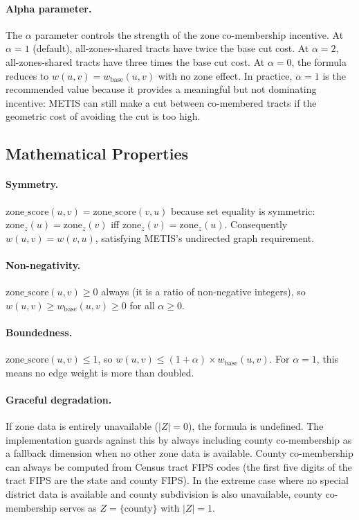 \paragraph{Alpha parameter.}
The $\alpha$ parameter controls the strength of the zone co-membership incentive.
At $\alpha = 1$ (default), all-zones-shared tracts have twice the base cut cost.
At $\alpha = 2$, all-zones-shared tracts have three times the base cut cost.
At $\alpha = 0$, the formula reduces to $w(u,v) = w_{\mathrm{base}}(u,v)$ with no
zone effect.
In practice, $\alpha = 1$ is the recommended value because it provides a meaningful
but not dominating incentive: METIS can still make a cut between co-membered tracts
if the geometric cost of avoiding the cut is too high.

\subsection{Mathematical Properties}

\paragraph{Symmetry.}
$\mathrm{zone\_score}(u,v) = \mathrm{zone\_score}(v,u)$ because set equality is
symmetric: $\mathrm{zone}_z(u) = \mathrm{zone}_z(v)$ iff $\mathrm{zone}_z(v) = \mathrm{zone}_z(u)$.
Consequently $w(u,v) = w(v,u)$, satisfying METIS's undirected graph requirement.

\paragraph{Non-negativity.}
$\mathrm{zone\_score}(u,v) \geq 0$ always (it is a ratio of non-negative integers),
so $w(u,v) \geq w_{\mathrm{base}}(u,v) \geq 0$ for all $\alpha \geq 0$.

\paragraph{Boundedness.}
$\mathrm{zone\_score}(u,v) \leq 1$, so $w(u,v) \leq (1 + \alpha) \times w_{\mathrm{base}}(u,v)$.
For $\alpha = 1$, this means no edge weight is more than doubled.

\paragraph{Graceful degradation.}
If zone data is entirely unavailable ($|Z| = 0$), the formula is undefined.
The implementation guards against this by always including county co-membership
as a fallback dimension when no other zone data is available.
County co-membership can always be computed from Census tract FIPS codes (the
first five digits of the tract FIPS are the state and county FIPS).
In the extreme case where no special district data is available and county subdivision
is also unavailable, county co-membership serves as $Z = \{$county$\}$ with $|Z| = 1$.


